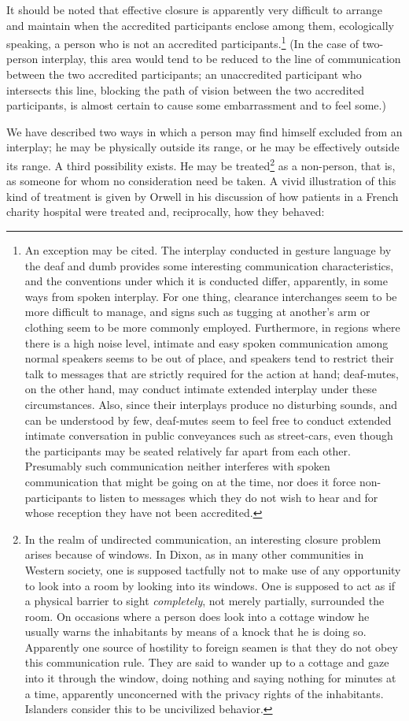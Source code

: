 \documentclass[openany,nobib]{tufte-book}
\begin{document}
It should be noted that effective closure is apparently very difficult
to arrange and maintain when the accredited participants enclose among
them, ecologically speaking, a person who is not an accredited
participants.\footnote{An exception may be cited. The interplay
  conducted in gesture language by the deaf and dumb provides some
  interesting communication characteristics, and the conventions under
  which it is conducted differ, apparently, in some ways from spoken
  interplay. For one thing, clearance interchanges seem to be more
  difficult to manage, and signs such as tugging at another's arm or
  clothing seem to be more commonly employed. Furthermore, in regions
  where there is a high noise level, intimate and easy spoken
  communication among normal speakers seems to be out of place, and
  speakers tend to restrict their talk to messages that are strictly
  required for the action at hand; deaf-mutes, on the other hand, may
  conduct intimate extended interplay under these circumstances. Also,
  since their interplays produce no disturbing sounds, and can be
  understood by few, deaf-mutes seem to feel free to conduct extended
  intimate conversation in public conveyances such as street-cars, even
  though the participants may be seated relatively far apart from each
  other. Presumably such communication neither interferes with spoken
  communication that might be going on at the time, nor does it force
  non-participants to listen to messages which they do not wish to hear
  and for whose reception they have not been accredited.} (In the case
of two-person interplay, this area would tend to be reduced to the line
of communication between the two accredited participants; an
unaccredited participant who intersects this line, blocking the path of
vision between the two accredited participants, is almost certain to
cause some embarrassment and to feel some.)

We have described two ways in which a person may find himself excluded
from an interplay; he may be physically outside its range, or he may be
effectively outside its range. A third possibility exists. He may be
treated\footnote{In the realm of undirected communication, an
  interesting closure problem arises because of windows. In Dixon, as in
  many other communities in Western society, one is supposed tactfully
  not to make use of any opportunity to look into a room by looking into
  its windows. One is supposed to act as if a physical barrier to sight
  \emph{completely}, not merely partially, surrounded the room. On
  occasions where a person does look into a cottage window he usually
  warns the inhabitants by means of a knock that he is doing so.
  Apparently one source of hostility to foreign seamen is that they do
  not obey this communication rule. They are said to wander up to a
  cottage and gaze into it through the window, doing nothing and saying
  nothing for minutes at a time, apparently unconcerned with the privacy
  rights of the inhabitants. Islanders consider this to be uncivilized
  behavior.} as a non-person, that is, as someone for whom no
consideration need be taken. A vivid illustration of this kind of
treatment is given by Orwell in his discussion of how patients in a
French charity hospital were treated and, reciprocally, how they
behaved:
\end{document}
